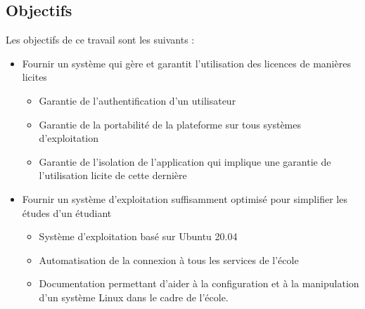\subsection*{Objectifs}
Les objectifs de ce travail sont les suivants :
\begin{itemize}
    \item Fournir un système qui gère et garantit l'utilisation des licences de manières licites
    \begin{itemize}
        \item Garantie de l'authentification d'un utilisateur
        \item Garantie de la portabilité de la plateforme sur tous systèmes d'exploitation
        \item Garantie de l'isolation de l'application qui implique une garantie de l'utilisation licite de cette dernière
    \end{itemize}
    \item Fournir un système d'exploitation suffisamment optimisé pour simplifier les études d'un étudiant
    \begin{itemize}
        \item Système d'exploitation basé sur Ubuntu 20.04
        \item Automatisation de la connexion à tous les services de l'école
        \item Documentation permettant d'aider à la configuration et à la manipulation d'un système Linux dans le cadre de l'école.
    \end{itemize}
\end{itemize}


